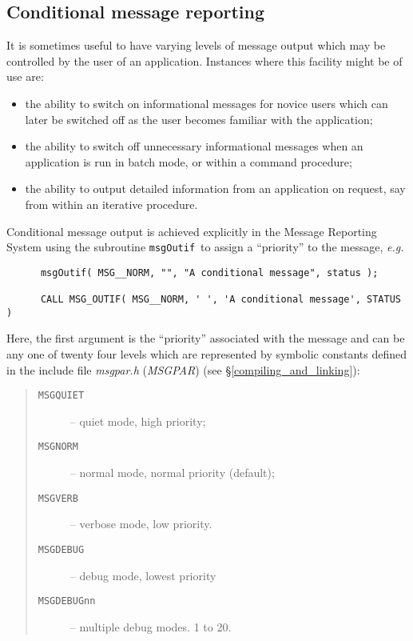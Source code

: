 \documentclass[twoside,11pt]{article}
\newcommand{\htmlref}[2]{#1}
\newcommand{\latex}[1]{#1}
\newcommand{\xlabel}[1]{}
\renewcommand{\_}{\texttt{\symbol{95}}}
\newcommand{\func}[1]{\texttt{#1}}
\newcommand{\const}[1]{\texttt{#1}}
\newcommand{\fname}[1]{\textit{#1}}
\newcommand{\msgnorm}{\const{MSG\_\_NORM}}
\newcommand{\msgverb}{\const{MSG\_\_VERB}}
\newcommand{\msgquiet}{\const{MSG\_\_QUIET}}
\newcommand{\msgdebug}{\const{MSG\_\_DEBUG}}
\newcommand{\msgoutif}{\func{msgOutif}}
\begin{document}
\subsection{\xlabel{conditional_message_reporting}Conditional message reporting}
It is sometimes useful to have varying levels of message output which 
may be controlled by the user of an application.
Instances where this facility might be of use are:
\begin {itemize}
\item the ability to switch on informational messages for novice users
which can later be switched off as the user becomes familiar with 
the application;
\item the ability to switch off unnecessary informational messages when
an application is run in batch mode, or within a command procedure;
\item the ability to output detailed information from an application on 
request, say from within an iterative procedure.
\end {itemize}
Conditional message output is achieved explicitly in the Message Reporting
System using the subroutine \msgoutif\ to assign a ``priority'' to the
message, \textit{e.g.}
\begin {small}
\begin{verbatim}
      msgOutif( MSG__NORM, "", "A conditional message", status );

      CALL MSG_OUTIF( MSG__NORM, ' ', 'A conditional message', STATUS )
\end{verbatim}
\end {small}
Here, the first argument is the ``priority'' associated with the 
message and can be any one of twenty four levels which are 
represented by symbolic constants defined in the include file 
\htmlref
{\fname{msg\_par.h} (\fname{MSG\_PAR})}{compiling_and_linking}\latex{ (see \S\ref{compiling_and_linking})}:
\begin {quote}
\begin {description}
\item [\msgquiet] -- quiet mode, high priority;
\item [\msgnorm] -- normal mode, normal priority (default);
\item [\msgverb] -- verbose mode, low priority.
\item [\msgdebug] -- debug mode, lowest priority
\item [\const{MSG\_\_DEBUGnn}] -- multiple debug modes. 1 to 20.
\end {description}
\end {quote}
\end{document}
